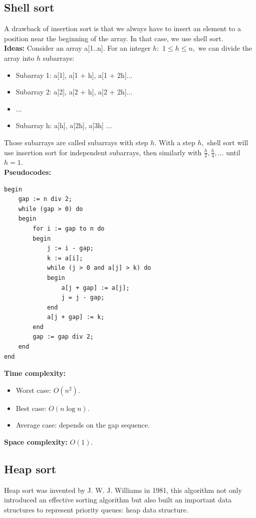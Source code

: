 \documentclass[12pt,a4paper]{article}
\begin{document}
\subsection{Shell sort}
\label{shellsort}
A drawback of insertion sort is that we always have to insert an element to a position near the beginning of the array. In that case, we use shell sort.\\
\textbf{Ideas:} Consider an array a[1..n]. For an integer $h:$ $1 \leqslant h \leqslant n,$ we can divide the array into $h$ subarrays:
\begin{itemize}
\item Subarray 1: a[1], a[1 + h], a[1 + 2h]...
\item Subarray 2: a[2], a[2 + h], a[2 + 2h]...
\item ...
\item Subarray h: a[h], a[2h], a[3h] ...
\end{itemize}
Those subarrays are called subarrays with step $h.$ With a step $h,$ shell sort will use insertion sort for independent subarrays, then similarly with $\frac{h}{2}, \frac{h}{4}, ...$ until $h = 1.$\\
\textbf{Pseudocodes:}
\lstset{language=Pascal} 
\begin{lstlisting}[caption = {Shell sort}]
begin
	gap := n div 2;
	while (gap > 0) do
	begin
		for i := gap to n do
		begin
			j := i - gap;
			k := a[i];
			while (j > 0 and a[j] > k) do
			begin
				a[j + gap] := a[j];
				j = j - gap;
			end
			a[j + gap] := k;
		end	
		gap := gap div 2;
	end
end
\end{lstlisting}
\textbf{Time complexity:} \cite{shell}
\begin{itemize}
\item Worst case: $O \left( {n^2} \right).$
\item Best case: $O \left( {n \log n} \right).$
\item Average case: depends on the gap sequence.
\end{itemize}
\textbf{Space complexity:} $O \left( {1} \right).$ \cite{shell}

\subsection{Heap sort}
Heap sort was invented by J. W. J. Williams in 1981, this algorithm not only introduced an effective sorting algorithm but also built an important data structures to represent priority queues: heap data structure.
\end{document}
